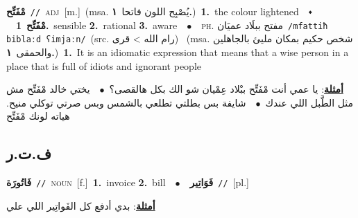 \documentclass[10pt,a4paper,twoside]{article} %
\begin{document}
\begin{multicols}{2}
{\setlength\topsep{0pt}\textbf{\foreignlanguage{arabic}{مْفَتِّح}}\ {\color{gray}\texttt{//}\color{black}}\ \textsc{adj}\ [m.]\ \color{gray}(msa. \foreignlanguage{arabic}{يُصْبِح اللون فاتحا}~\foreignlanguage{arabic}{\textbf{١.}})\color{black}\ \textbf{1.}~the colour lightened\ \ $\smblkdiamond$\ \ \setlength\topsep{0pt}\textbf{\foreignlanguage{arabic}{مْفَتِّح}}\ \textbf{1.}~sensible  \textbf{2.}~rational  \textbf{3.}~aware\ \ $\bullet$\ \ \textsc{ph.} \color{gray} \foreignlanguage{arabic}{مفتح ببلَاد عميَان}\color{black}\ {\color{gray}\texttt{/{\sffamily mfattiħ biblaːd ʕimjaːn}/}\color{black}}\ \color{gray}(src. \foreignlanguage{arabic}{رام الله > قرى})\color{black}\ \color{gray} (msa. \foreignlanguage{arabic}{شخص حكيم بمكان مليئ بالجاهلين والحمقى}~\foreignlanguage{arabic}{\textbf{١.}})\color{black}\ \textbf{1.}~It is an idiomatic expression that means that a wise person in a place that is full of idiots and ignorant people\  \begin{flushright}\color{gray}\foreignlanguage{arabic}{\textbf{\underline{\foreignlanguage{arabic}{أمثلة}}}: يا عمي أنت مْفَتِّح ببْلاد عِمْيان شو الك بكل هالقصى؟\ $\bullet$\ \  يختي خالد مْفَتِّح مش مثل الطَّبل اللي عندك\ $\bullet$\ \  شايفة بس بطلتي تطلعي بالشمس وبس صرتي توكلي منيح. هياته لونك مْفَتِّح}\end{flushright}\color{black}} \vspace{2mm}

\vspace{-3mm}
\subsection*{\color{blue}\foreignlanguage{arabic}{ف.ت.ر}\color{blue}{}} 

{\setlength\topsep{0pt}\textbf{\foreignlanguage{arabic}{فَاتُورَة}}\ {\color{gray}\texttt{//}\color{black}}\ \textsc{noun}\ [f.]\ \textbf{1.}~invoice  \textbf{2.}~bill\ \ $\bullet$\ \ \setlength\topsep{0pt}\textbf{\foreignlanguage{arabic}{فَوَاتِير}}\ {\color{gray}\texttt{//}\color{black}}\ [pl.]\  \begin{flushright}\color{gray}\foreignlanguage{arabic}{\textbf{\underline{\foreignlanguage{arabic}{أمثلة}}}: بدي أدفع كل الفَواتِير اللي علي}\end{flushright}\color{black}} \vspace{2mm}


\end{multicols}
\end{document}
